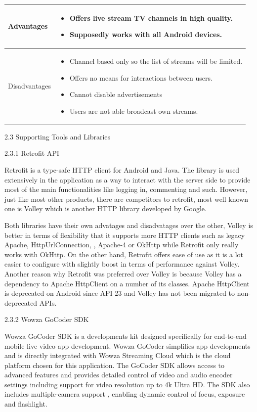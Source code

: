 \documentclass{article}
\begin{document}
\begin{flushleft}
\begin{tabular}{| p{2.2cm} | p{9cm} |}
\hline
Advantages &
\begin{itemize}
	\item Offers live stream TV channels in high quality.
	\item Supposedly works with all Android devices.
\end{itemize}\\
\hline
Disadvantages &
\begin{itemize}
	\item Channel based only so the list of streams will be limited.
	\item Offers no means for interactions between users.
	\item Cannot disable advertisements
	\item Users are not able broadcast own streams.
\end{itemize}\\
\hline
\end{tabular} \par
{\Large 2.3 Supporting Tools and Libraries}\par
{\large 2.3.1 Retrofit API}\par
Retrofit is a type-safe HTTP client for Android and Java. The library is used extensively in the application as a way to interact with the server side to provide most of the main functionalities like logging in, commenting and such. However, just like most other products, there are competitors to retrofit, most well known one is Volley which is another HTTP library developed by Google.\par
Both libraries have their own advatages and disadvatages over the other, Volley is better in terms of flexibility that it supports more HTTP clients such as legacy Apache, HttpUrlConnection, , Apache-4 or OkHttp while Retrofit only really works with OkHttp. On the other hand, Retrofit offers ease of use as it is a lot easier to configure with slightly boost in terms of performance against Volley. Another reason why Retrofit was preferred over Volley is because Volley has a dependency  to Apache HttpClient on a number of its classes. Apache HttpClient is deprecated on Android since API 23 and Volley has not been migrated to non-deprecated APIs.\par
{\large 2.3.2 Wowza GoCoder SDK}\par
Wowza GoCoder SDK is a developments kit designed specifically for end-to-end mobile live video app development. Wowza GoCoder simplifies app developments and is directly integrated with Wowza Streaming Cloud which is the cloud platform chosen for this application. The GoCoder SDK allows access to advanced features and provides detailed control of video and audio encoder settings including support for video resolution up to 4k Ultra HD. The SDK also includes multiple-camera support , enabling dynamic control of focus, exposure and flashlight.\par

\end{flushleft}
\end{document}
